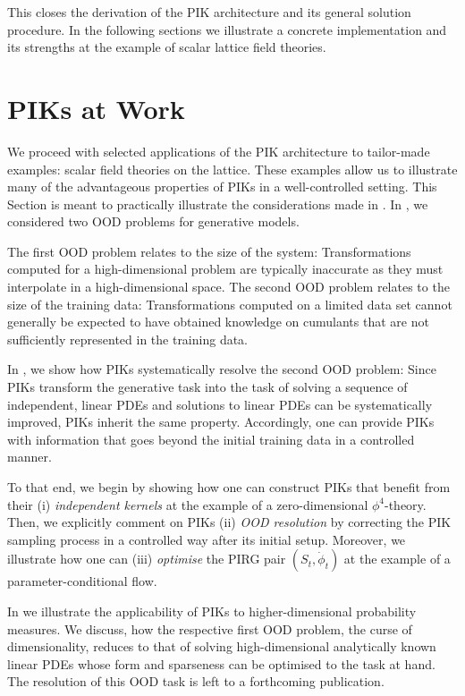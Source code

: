 \documentclass[reprint,amsmath,amssymb,aps,pra,superscriptaddress,nofootinbib,twocolumn,floatfix,nolongbibliography]{revtex4-2}
\begin{document}
This closes the derivation of the PIK architecture and its general solution procedure. In the following sections we illustrate a concrete implementation and its strengths at the example of scalar lattice field theories.


\section{PIKs at Work}
\label{sec:PIKsAtWork}

We proceed with selected applications of the PIK architecture to tailor-made examples: scalar field theories on the lattice. These examples allow us to illustrate many of the advantageous properties of PIKs in a well-controlled setting. This Section is meant to practically illustrate the considerations made in . In , we considered two OOD problems for generative models. 

The first OOD problem relates to the size of the system: Transformations computed for a high-dimensional problem are typically inaccurate as they must interpolate in a high-dimensional space. 
The second OOD problem relates to the size of the training data: Transformations computed on a limited data set cannot generally be expected to have obtained knowledge on cumulants that are not sufficiently represented in the training data.

In , we show how PIKs systematically resolve the second OOD problem: Since PIKs transform the generative task into the task of solving a sequence of independent, linear PDEs and solutions to linear PDEs can be systematically improved, PIKs inherit the same property. Accordingly, one can provide PIKs with information that goes beyond the initial training data in a controlled manner.

To that end, we begin by showing how one can construct PIKs that benefit from their (i) \textit{independent kernels} at the example of a zero-dimensional $\phi^4$-theory. Then, we explicitly comment on PIKs (ii) \textit{OOD resolution} by correcting the PIK sampling process in a controlled way after its initial setup. Moreover, we illustrate how one can (iii) \textit{optimise} the PIRG pair $(S_t, \dot{\phi}_t)$ at the example of a parameter-conditional flow.

In  we illustrate the applicability of PIKs to higher-dimensional probability measures. We discuss, how the respective first OOD problem, the curse of dimensionality, reduces to that of solving high-dimensional analytically known linear PDEs whose form and sparseness can be optimised to the task at hand. The resolution of this OOD task is left to a forthcoming publication.
\end{document}
